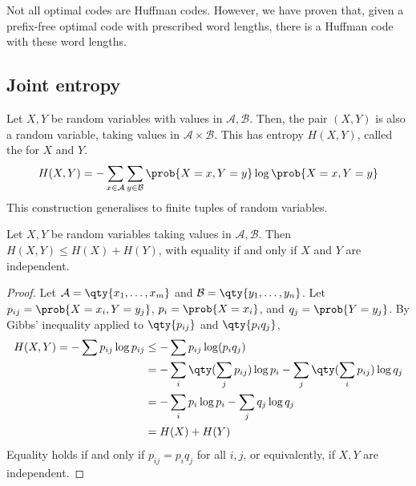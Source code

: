 \begin{remark}
    Not all optimal codes are Huffman codes.
    However, we have proven that, given a prefix-free optimal code with prescribed word lengths, there is a Huffman code with these word lengths.
\end{remark}

\subsection{Joint entropy}
Let $X, Y$ be random variables with values in $\mathcal A, \mathcal B$.
Then, the pair $(X, Y)$ is also a random variable, taking values in $\mathcal A \times \mathcal B$.
This has entropy $H(X,Y)$, called the  for $X$ and $Y$.
\[ H(X,Y) = - \sum_{x \in \mathcal A} \sum_{y \in \mathcal B} \prob{X = x, Y = y} \log \prob{X = x, Y = y} \]
This construction generalises to finite tuples of random variables.
\begin{lemma}
    Let $X, Y$ be random variables taking values in $\mathcal A, \mathcal B$.
    Then $H(X,Y) \leq H(X) + H(Y)$, with equality if and only if $X$ and $Y$ are independent.
\end{lemma}
\begin{proof}
    Let $\mathcal A = \qty{x_1, \dots, x_m}$ and $\mathcal B = \qty{y_1, \dots, y_n}$.
    Let $p_{ij} = \prob{X = x_i, Y = y_j}$, $p_i = \prob{X = x_i}$, and $q_j = \prob{Y = y_j}$.
    By Gibbs' inequality applied to $\qty{p_{ij}}$ and $\qty{p_i q_j}$,
    \begin{align*}
        H(X,Y) = -\sum p_{ij} \log p_{ij} &\leq -\sum p_{ij} \log(p_i q_j) \\
        &= -\sum_i \qty(\sum_j p_{ij}) \log p_i - \sum_j \qty(\sum_i p_{ij}) \log q_j \\
        &= -\sum_i p_i \log p_i - \sum_j q_j \log q_j \\
        &= H(X) + H(Y)
    \end{align*}
    Equality holds if and only if $p_{ij} = p_i q_j$ for all $i, j$, or equivalently, if $X, Y$ are independent.
\end{proof}
